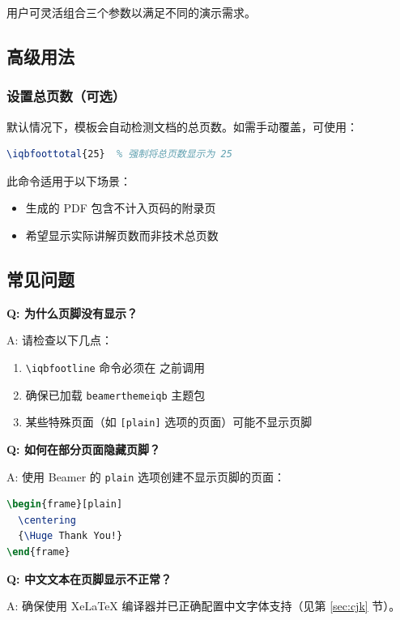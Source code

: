 用户可灵活组合三个参数以满足不同的演示需求。

\subsection{高级用法}

\subsubsection{设置总页数（可选）}

默认情况下，模板会自动检测文档的总页数。如需手动覆盖，可使用：

\begin{lstlisting}[style=blockstyle,language=TeX]
\iqbfoottotal{25}  % 强制将总页数显示为 25
\end{lstlisting}

此命令适用于以下场景：
\begin{itemize}
  \item 生成的 PDF 包含不计入页码的附录页
  \item 希望显示实际讲解页数而非技术总页数
\end{itemize}

\subsection{常见问题}

\textbf{Q: 为什么页脚没有显示？}

A: 请检查以下几点：
\begin{enumerate}
  \item \lstinline|\iqbfootline| 命令必须在 \lstinline|| 之前调用
  \item 确保已加载 \lstinline|beamerthemeiqb| 主题包
  \item 某些特殊页面（如 \lstinline|[plain]| 选项的页面）可能不显示页脚
\end{enumerate}

\textbf{Q: 如何在部分页面隐藏页脚？}

A: 使用 Beamer 的 \lstinline|plain| 选项创建不显示页脚的页面：

\begin{lstlisting}[style=blockstyle,language=TeX]
\begin{frame}[plain]
  \centering
  {\Huge Thank You!}
\end{frame}
\end{lstlisting}

\textbf{Q: 中文文本在页脚显示不正常？}

A: 确保使用 XeLaTeX 编译器并已正确配置中文字体支持（见第 \ref{sec:cjk} 节）。

